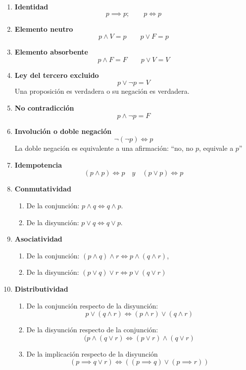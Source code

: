 \begin{enumerate}
	\item \textbf{Identidad}
	\[ p \implies p; \qquad p \iff p \]
	\item \textbf{Elemento neutro}
	\[ p \land V = p \qquad p \lor F = p \]
	\item \textbf{Elemento absorbente}
	\[ p \land F = F \qquad p \lor V = V\]
	\item \textbf{Ley del tercero excluido}
	\[ p \lor \neg p = V\]
	Una proposición es verdadera o su negación es verdadera.
	
	\item \textbf{No contradicción}
	\[ p \land \neg p = F \]
	\item \textbf{Involución o doble negación}
	\[ \neg (\neg p) \iff p \]
	La doble negación es equivalente a una afirmación: ``no, no $p$, equivale a $p$''
	\item \textbf{Idempotencia}
	\[ (p \land p) \iff p \quad y \quad (p \lor p) \iff p\]
	\item \textbf{Conmutatividad}
	\begin{enumerate}[label=\alph*)]
		\item De la conjunción: $p \land q \iff q \land p$. 		
		\item De la disyunción: $p \lor q \iff q \lor p$.
	\end{enumerate}
	\item \textbf{Asociatividad}
	\begin{enumerate}[label=\alph*)]
		\item De la conjunción: $(p \land q) \land r \iff p \land (q \land r)$,
		
		\item De la disyunción: $(p \lor q) \lor r \iff p \lor (q \lor r)$
	\end{enumerate}
	\item \textbf{Distributividad}
	\begin{enumerate}[label=\alph*)]
		\item De la conjunción respecto de la disyunción:
		\[ p \lor (q \land r) \iff (p \land r) \lor (q \land r) \]
		
		\item De la disyunción respecto de la conjunción:
		\[(p \land (q \lor r) \iff (p \lor r) \land (q \lor r) \]
		
		\item De la implicación respecto de la disyunción
		\[ \left( p \implies q \lor r \right) \iff \left( (p \implies q) \lor (p \implies r) \right) \]


\end{enumerate}
\end{enumerate}
